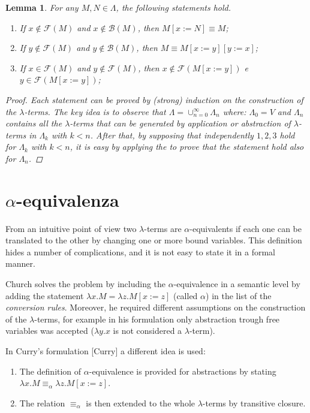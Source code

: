 \documentclass[a4paper,11pt]{article}
\newtheorem{lemma}{Lemma}
\theoremstyle{definition}
\newcommand{\FF}{\mathcal{F}}
\newcommand{\BB}{\mathcal{B}}
\begin{document}
\begin{lemma}
  For any $M,N\in\Lambda$, the following statements hold.
  \begin{enumerate}
    \item If $x\not\in\FF(M)$ and $x\not\in\BB(M)$, then $M[x:=N]\equiv M$;
    \item If $y\not\in\FF(M)$ and $y\not\in\BB(M)$, then $M\equiv M[x:=y][y:=x]$;
    \item If $x\in\FF(M)$ and $y\not\in\FF(M)$, then $x\not\in\FF(M[x:=y])$ e
      $y\in\FF(M[x:=y])$;
  \end{enumerate}
  \label{lem:sost}
  \begin{proof}
    Each statement can be proved by (strong) induction on the construction of the
    $\lambda$-terms. The key idea is to observe that $\Lambda =
    \cup_{n=0}^\infty\Lambda_n$ where: $\Lambda_0=V$ and $\Lambda_n$ contains all the
    $\lambda$-terms that can be generated by application or abstraction of $\lambda$-terms 
    in $\Lambda_k$ with $k<n$. After that, by supposing that independently $1,2,3$ hold
    for $\Lambda_k$ with $k<n$, it is easy by applying the 
    to prove that the statement hold also for $\Lambda_n$.
  \end{proof}
\end{lemma}

\section{$\alpha$-equivalenza}
From an intuitive point of view two $\lambda$-terms are $\alpha$-equivalents
if each one can be translated to the other by changing one or more bound
variables. This definition hides a number of complications, and it is not
easy to state it in a formal manner. 

Church solves the problem by including the $\alpha$-equivalence in a semantic
level by adding the statement $\lambda x.M = \lambda z.M[x:=z]$ (called
$\alpha$) in the list of the \textit{conversion rules}. Moreover, 
he required different assumptions on the construction of the
$\lambda$-terms, for example in his formulation only abstraction trough free
variables was accepted ($\lambda y.x$ is not considered a $\lambda$-term).

In Curry's formulation [Curry] a different idea is used: 
\begin{enumerate}
  \item The definition of $\alpha$-equivalence is provided for abstractions
    by stating $\lambda x.M \equiv_\alpha \lambda z.M[x:=z]$. 
  \item The relation $\equiv_\alpha$ is then extended to the whole
$\lambda$-terms by transitive closure. 
\end{enumerate}
\end{document}
